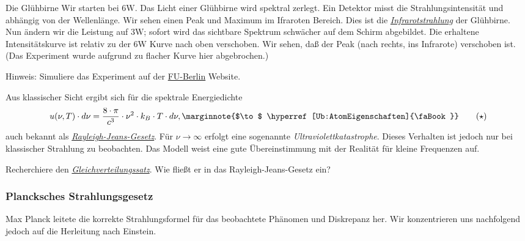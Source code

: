 \documentclass{subfiles}
\begin{document}
                \begin{Experiment}{Die Glühbirne}
                    Wir starten bei $6\si\watt$. Das Licht einer Glühbirne wird spektral zerlegt. Ein Detektor misst die Strahlungsintensität und abhängig von der Wellenlänge. Wir sehen einen Peak und Maximum im Ifraroten Bereich. Dies ist die \href{https://de.wikipedia.org/wiki/Infrarotstrahlung}{\emph{Infrarotstrahlung}} der Glühbirne.\\
                    
                    Nun ändern wir die Leistung auf $3\si\watt$; sofort wird das sichtbare Spektrum schwächer auf dem Schirm abgebildet. Die erhaltene Intensitätskurve ist relativ zu der $6\si\watt$ Kurve nach oben verschoben. Wir sehen, daß der Peak (nach rechts, ins Infrarote) verschoben ist. (Das Experiment wurde aufgrund zu flacher Kurve hier abgebrochen.)

                    Hinweis: Simuliere das Experiment auf der \href{https://tetfolio.fu-berlin.de/web/1089581}{FU-Berlin} Website.
                \end{Experiment}

                \noindent Aus klassischer Sicht ergibt sich für die spektrale Energiedichte 
                \begin{align*}
                    u(\nu,T)\cdot d\nu = \frac{8\cdot\pi}{c^3}\cdot\nu^2\cdot k_B\cdot T\cdot d\nu, \label{eq:RayleighJeans}\marginnote{$\to$ \hyperref[Ub:AtomEigenschaften]{\faBook}}\tag{$\star$}
                \end{align*}
                auch bekannt als \href{https://de.wikipedia.org/wiki/Rayleigh-Jeans-Gesetz}{\emph{Rayleigh-Jeans-Gesetz}}. Für $\nu\to\infty$ erfolgt eine sogenannte \emph{Ultraviolettkatastrophe}. Dieses Verhalten ist jedoch nur bei klassischer Strahlung zu beobachten. Das Modell weist eine gute Übereinstimmung mit der Realität für kleine Frequenzen auf.

                \begin{Aufgabe}
                    \nr{} Recherchiere den \href{https://de.wikipedia.org/wiki/Gleichverteilungssatz}{\emph{Gleichverteilungssatz}}. Wie fließt er in das Rayleigh-Jeans-Gesetz ein?
                \end{Aufgabe}

            \subsubsection*{Plancksches Strahlungsgesetz}\label{Ub:PlanckschesStrahlungsgesetz}\marginnote{$\to$ \hyperref[Ub:AtomEigenschaften]{\faBook}}
                Max Planck leitete die korrekte Strahlungsformel für das beobachtete Phänomen und Diskrepanz her. Wir konzentrieren uns nachfolgend jedoch auf die Herleitung nach Einstein. \\
\end{document}
